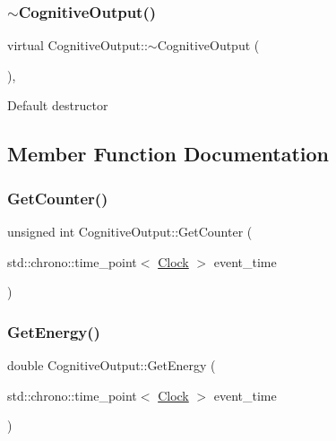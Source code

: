 \subsubsection{\texorpdfstring{$\sim$\+Cognitive\+Output()}{~CognitiveOutput()}}
{\footnotesize\ttfamily virtual Cognitive\+Output\+::$\sim$\+Cognitive\+Output (\begin{DoxyParamCaption}{ }\end{DoxyParamCaption})\hspace{0.3cm}{\ttfamily [inline]}, {\ttfamily [virtual]}}

Default destructor 

\subsection{Member Function Documentation}
\mbox{\label{classCognitiveOutput_a73efe6441491eb54df2f4dbd78b3903e}} 
\subsubsection{\texorpdfstring{Get\+Counter()}{GetCounter()}}
{\footnotesize\ttfamily unsigned int Cognitive\+Output\+::\+Get\+Counter (\begin{DoxyParamCaption}\item[{std\+::chrono\+::time\+\_\+point$<$ \mbox{\hyperlink{universe_8h_a0ef8d951d1ca5ab3cfaf7ab4c7a6fd80}{Clock}} $>$}]{event\+\_\+time }\end{DoxyParamCaption})\hspace{0.3cm}{\ttfamily [inline]}}

\mbox{\label{classCognitiveOutput_abb923045db565ecdbac431469217cebf}} 
\subsubsection{\texorpdfstring{Get\+Energy()}{GetEnergy()}}
{\footnotesize\ttfamily double Cognitive\+Output\+::\+Get\+Energy (\begin{DoxyParamCaption}\item[{std\+::chrono\+::time\+\_\+point$<$ \mbox{\hyperlink{universe_8h_a0ef8d951d1ca5ab3cfaf7ab4c7a6fd80}{Clock}} $>$}]{event\+\_\+time }\end{DoxyParamCaption})\hspace{0.3cm}{\ttfamily [inline]}}

